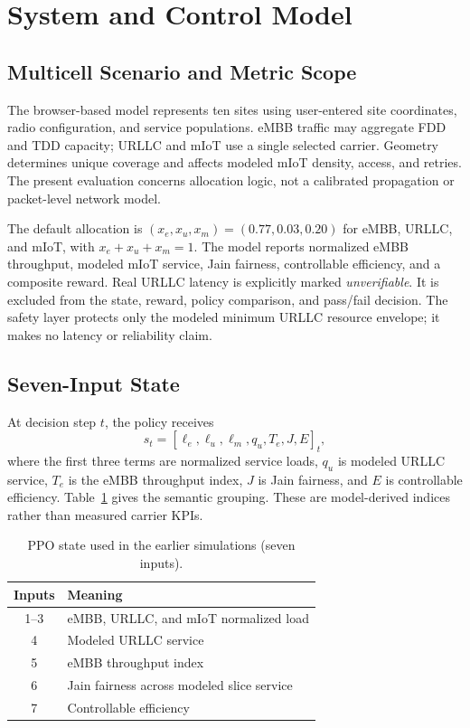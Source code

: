 \documentclass[conference]{IEEEtran}
\begin{document}
\section{System and Control Model}
\subsection{Multicell Scenario and Metric Scope}
The browser-based model represents ten sites using user-entered site coordinates, radio configuration, and service populations. eMBB traffic may aggregate FDD and TDD capacity; URLLC and mIoT use a single selected carrier. Geometry determines unique coverage and affects modeled mIoT density, access, and retries. The present evaluation concerns allocation logic, not a calibrated propagation or packet-level network model.

The default allocation is $(x_e,x_u,x_m)=(0.77,0.03,0.20)$ for eMBB, URLLC, and mIoT, with $x_e+x_u+x_m=1$. The model reports normalized eMBB throughput, modeled mIoT service, Jain fairness, controllable efficiency, and a composite reward. Real URLLC latency is explicitly marked \emph{unverifiable}. It is excluded from the state, reward, policy comparison, and pass/fail decision. The safety layer protects only the modeled minimum URLLC resource envelope; it makes no latency or reliability claim.

\subsection{Seven-Input State}
At decision step $t$, the policy receives
\begin{equation}
s_t=[\ell_e,\ell_u,\ell_m,q_u,T_e,J,E]_t,
\end{equation}
where the first three terms are normalized service loads, $q_u$ is modeled URLLC service, $T_e$ is the eMBB throughput index, $J$ is Jain fairness, and $E$ is controllable efficiency. Table~\ref{tab:state} gives the semantic grouping. These are model-derived indices rather than measured carrier KPIs.

\begin{table}[t]
\centering
\caption{PPO state used in the earlier simulations (seven inputs).}
\label{tab:state}
\begin{tabular}{cl}
\toprule
Inputs & Meaning \\
\midrule
1--3 & eMBB, URLLC, and mIoT normalized load \\
4 & Modeled URLLC service \\
5 & eMBB throughput index \\
6 & Jain fairness across modeled slice service \\
7 & Controllable efficiency \\
\bottomrule
\end{tabular}
\end{table}
\end{document}
